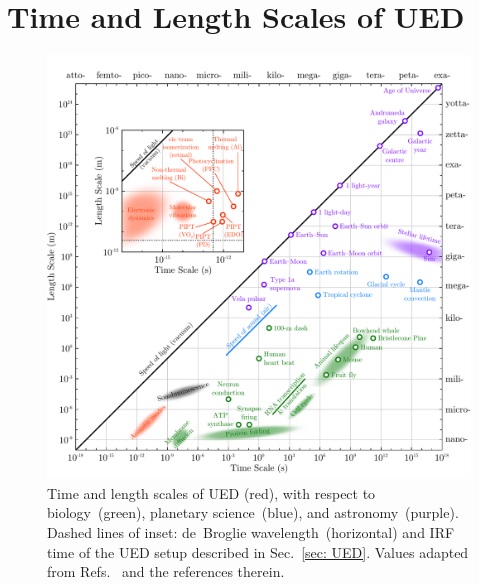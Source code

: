 
\chapter{Time and Length Scales of UED}
\label{ap: intro-scales}

\begin{figure}[hp]
  \centering
  \includegraphics[width = \textwidth]{Figures/fig_intro_scales.pdf}
  \caption[Time and length scales of UED.]{
    Time and length scales of UED (red),
    with respect to biology~(green), planetary science~(blue), and astronomy~(purple).
    Dashed lines of inset: de~Broglie wavelength~(horizontal) and IRF time of
    the UED setup described in Sec.~\ref{sec: UED}.
    Values adapted from Refs.~\cite{Adcock2006, Zewail2006, Chergui2009, Krausz2009, Young2018}
    and the references therein.
  }
  \label{fig: intro-scales}
\end{figure}
